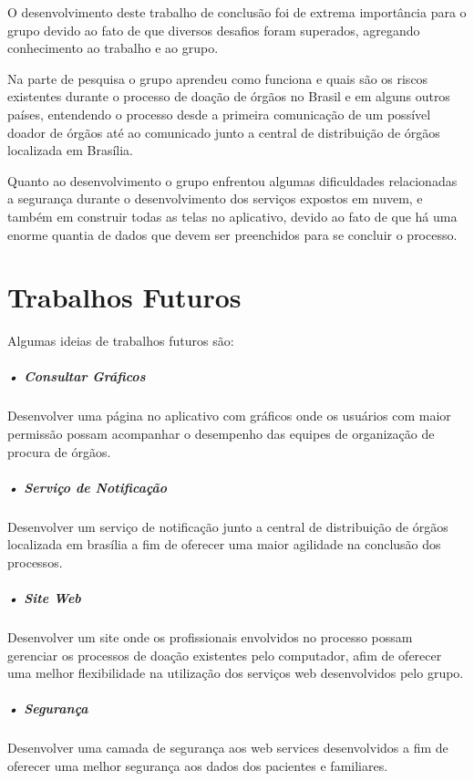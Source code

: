 \documentclass[portuguese,oneside]{tcc}
\begin{document}
O desenvolvimento deste trabalho de conclusão foi de extrema importância para o grupo devido ao fato de que diversos desafios foram superados, agregando conhecimento ao trabalho e ao grupo.

Na parte de pesquisa o grupo aprendeu como funciona e quais são os riscos existentes durante o processo de doação de órgãos no Brasil e em alguns outros países, entendendo o processo desde a primeira comunicação de um possível doador de órgãos até ao comunicado junto a central de distribuição de órgãos localizada em Brasília.

Quanto ao desenvolvimento o grupo enfrentou algumas dificuldades relacionadas a segurança durante o desenvolvimento dos serviços expostos em nuvem, e também em construir todas as telas no aplicativo, devido ao fato de que há uma enorme quantia de dados que devem ser preenchidos para se concluir o processo.

\section{Trabalhos Futuros}
Algumas ideias de trabalhos futuros são:

\subparagraph{• Consultar Gráficos}
Desenvolver uma página no aplicativo com gráficos onde os usuários com maior permissão possam acompanhar o desempenho das equipes de organização de procura de órgãos.

\subparagraph{• Serviço de Notificação}
Desenvolver um serviço de notificação junto a central de distribuição de órgãos localizada em brasília a fim de oferecer uma maior agilidade na conclusão dos processos.

\subparagraph{• Site Web}
Desenvolver um site onde os profissionais envolvidos no processo possam gerenciar os processos de doação existentes pelo computador, afim de oferecer uma melhor flexibilidade na utilização dos serviços web desenvolvidos pelo grupo.

\subparagraph{• Segurança}
Desenvolver uma camada de segurança aos web services desenvolvidos a fim de oferecer uma melhor segurança aos dados dos pacientes e familiares.









\end{document}
